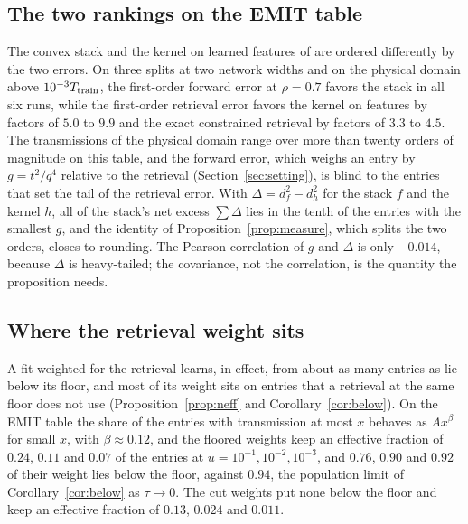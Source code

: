 \documentclass[11pt]{article}
\theoremstyle{remark}
\newcommand{\1}{\mathbf{1}}
\begin{document}
\subsection{The two rankings on the EMIT table}\label{sec:rankings}

The convex stack and the kernel on learned features of \cite{shmalo2} are ordered differently by the two errors. On
three splits at two network widths and on the physical domain above $10^{-3}T_{\rm train}$, the first-order forward
error at $\rho=0.7$ favors the stack in all six runs, while the first-order retrieval error favors the kernel on features
by factors of $5.0$ to $9.9$ and the exact constrained retrieval by factors of $3.3$ to $4.5$. The transmissions of the
physical domain range over more than twenty orders of magnitude on this table, and the forward error, which weighs an
entry by $g=t^2/q^4$ relative to the retrieval (Section~\ref{sec:setting}), is blind to the entries that set the tail of
the retrieval error. With $\Delta=d_f^2-d_h^2$ for the stack $f$ and the kernel $h$, all of the stack's net excess
$\sum\Delta$ lies in the tenth of the entries with the smallest $g$, and the identity of Proposition~\ref{prop:measure},
which splits the two orders, closes to rounding. The Pearson correlation of $g$ and $\Delta$ is only $-0.014$, because
$\Delta$ is heavy-tailed; the covariance, not the correlation, is the quantity the proposition needs.

\subsection{Where the retrieval weight sits}\label{sec:weightsits}

A fit weighted for the retrieval learns, in effect, from about as many entries as lie below its floor, and most of its
weight sits on entries that a retrieval at the same floor does not use (Proposition~\ref{prop:neff} and
Corollary~\ref{cor:below}). On the EMIT table the share of the entries with transmission at most $x$ behaves as
$Ax^\beta$ for small $x$, with $\beta\approx0.12$, and the floored weights keep an effective fraction of $0.24$, $0.11$ and $0.07$ of the entries at $u=10^{-1},10^{-2},10^{-3}$, and $0.76$, $0.90$ and $0.92$ of
their weight lies below the floor, against $0.94$, the population limit of Corollary~\ref{cor:below} as $\tau\to0$. The cut weights put none below the floor and keep an
effective fraction of $0.13$, $0.024$ and $0.011$.
\end{document}
